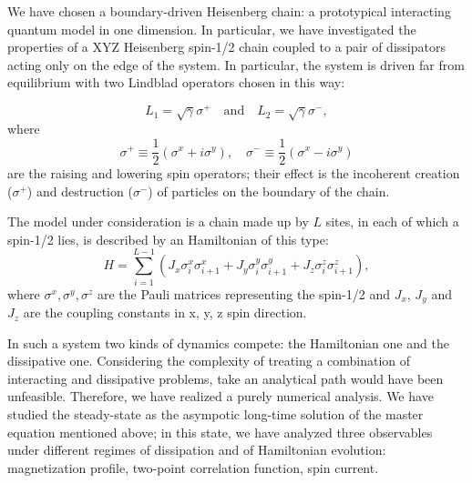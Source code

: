 \documentclass[12pt]{extarticle}
\begin{document}
We have chosen a boundary-driven Heisenberg chain: a prototypical interacting quantum model in one dimension. In particular, we have investigated the properties of a XYZ Heisenberg spin-1/2 chain coupled to a pair of dissipators acting only on the edge of the system. In particular, the system is driven far from equilibrium with two Lindblad operators chosen in this way:

\begin{equation*}
    L_1 = \sqrt{\gamma} \sigma^+ \quad \text{and} \quad L_2 =\sqrt{\gamma}\sigma^-,
\end{equation*}
where 
\begin{equation*}
    \sigma^+ \equiv \frac{1}{2}(\sigma^x + i\sigma^y), \quad \sigma^- \equiv \frac{1}{2}(\sigma^x - i\sigma^y)
\end{equation*}
are the raising and lowering spin operators; their effect is the incoherent creation ($\sigma^+$) and destruction ($\sigma^-$) of particles on the boundary of the chain.


The model under consideration is a chain made up by $L$ sites, in each of which a spin-1/2 lies, is described by an Hamiltonian of this type:
\begin{equation*}
    H = \sum_{i = 1}^{L-1} (J_x\sigma_i^x\sigma_{i+1}^x + J_y\sigma_i^y \sigma_{i+1}^y + J_z \sigma_i^z \sigma_{i+1}^z),
\end{equation*}
where $\sigma^x, \sigma^y, \sigma^z$ are the Pauli matrices representing the spin-1/2 and $J_x$, $J_y$ and $J_z$ are the coupling constants in x, y, z spin direction.

In such a system two kinds of dynamics compete: the Hamiltonian one and the dissipative one. Considering the complexity of treating a combination of interacting and dissipative problems, take an analytical path would have been unfeasible. Therefore, we have realized a purely numerical analysis. We have studied the steady-state as the asympotic long-time solution of the master equation mentioned above; in this state, we have analyzed three observables under different regimes of dissipation and of Hamiltonian evolution: magnetization profile, two-point correlation function, spin current. 
\end{document}
